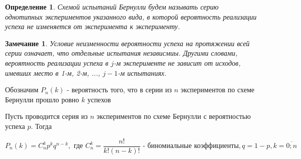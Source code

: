 \documentclass[a4paper, 14pt]{report}
\newtheorem{defenition}{Определение}[chapter]
\newtheorem{note}{Замечание}[chapter]
\begin{document}
\begin{defenition}
    Схемой испытаний Бернулли будем называть серию однотипных экспериментов указанного вида, в которой вероятность реализации успеха не изменяется от эксперимента к эксперименту.
\end{defenition}

\begin{note}
    Условие неизменности вероятности успеха на протяжении всей серии означает, что отдельные испытания независмиы. Другими словами, вероятность реализации успеха в $j$-м эксперименте не зависит от исходов, имевших место в 1-м, 2-м, ..., $j-1$-м испытаниях.
\end{note}

Обозначим $P_n(k)$ - вероятность того, что в серии из $n$ экспериментов по схеме Бернулли прошло ровно $k$ успехов

\begin{theorem}
    Пусть проводится серия из $n$ экспериментов по схеме Бернулли с вероятностью успеха $p$. Тогда

    $$
    P_n(k) = C_n^k p^k q^{n-k}, \text{ где } C_n^k = \frac{n!}{k!(n-k)!} \text{ - биномиальные коэффициенты}, q = 1-p, k = \overline{0;n}
    $$
\end{theorem}
\end{document}

